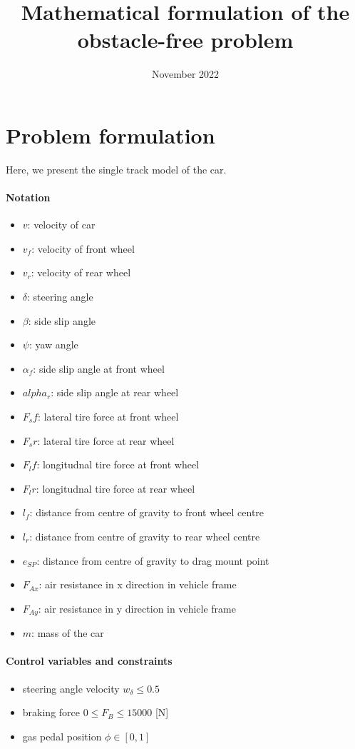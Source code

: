 \documentclass{article}
\title{Mathematical formulation of the obstacle-free problem}
\author{}
\date{November 2022}
\begin{document}
\maketitle

\section{Problem formulation}
Here, we present the single track model of the car.

\paragraph{Notation}

\begin{itemize}
    \item \(v\): velocity of car
    \item \(v_f\): velocity of front wheel
    \item \(v_r\): velocity of rear wheel
    \item \(\delta\): steering angle
    \item \(\beta\): side slip angle
    \item \(\psi\): yaw angle
    \item \(\alpha_f\): side slip angle at front wheel
    \item \(alpha_r\): side slip angle at rear wheel
    \item \(F_sf\): lateral tire force at front wheel
    \item \(F_sr\): lateral tire force at rear wheel
    \item \(F_lf\): longitudnal tire force at front wheel
    \item \(F_lr\): longitudnal tire force at rear wheel
    \item \(l_f\): distance from centre of gravity to front wheel centre
    \item \(l_r\): distance from centre of gravity to rear wheel centre
    \item \(e_{SP}\): distance from centre of gravity to drag mount point 
    \item \(F_{Ax}\): air resistance in x direction in vehicle frame
    \item \(F_{Ay}\): air resistance in y direction in vehicle frame
    \item \(m\): mass of the car
\end{itemize}

\paragraph{Control variables and constraints}
\begin{itemize}
    \item steering angle velocity \( w_{\delta} \leq 0.5 \) 
    \item braking force \( 0 \leq F_B \leq 15000 \) [N]
    \item gas pedal position \( \phi \in [0,1]\)
\end{itemize}
\end{document}
